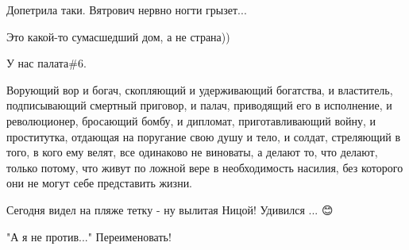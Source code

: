 \begin{itemize}
Допетрила таки. Вятрович нервно ногти грызет...

 
Это какой-то сумасшедший дом, а не страна))

 
У нас палата\#6.

 

Ворующий вор и богач, скопляющий и удерживающий богатства, и властитель,
подписывающий смертный приговор, и палач, приводящий его в исполнение, и
революционер, бросающий бомбу, и дипломат, приготавливающий войну, и
проститутка, отдающая на поругание свою душу и тело, и солдат, стреляющий в
того, в кого ему велят, все одинаково не виноваты, а делают то, что делают,
только потому, что живут по ложной вере в необходимость насилия, без которого
они не могут себе представить жизни.

 
Сегодня видел на пляже тетку - ну вылитая Ницой! Удивился ... 😊

 
"А я не против..."
Переименовать!

 



\end{itemize}
